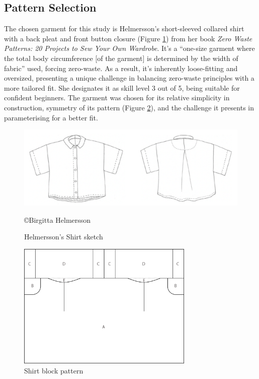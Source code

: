 \subsection{Pattern Selection}
The chosen garment for this study is Helmersson's short-sleeved collared shirt with a back pleat and front button closure (Figure \ref{fig:bh shirt sketch}) from her book \textit{Zero Waste Patterns: 20 Projects to Sew Your Own Wardrobe}. It's a ``one-size garment where the total body circumference [of the garment] is determined by the width of fabric'' used, forcing zero-waste. As a result, it's inherently loose-fitting and oversized, presenting a unique challenge in balancing zero-waste principles with a more tailored fit. She designates it as skill level 3 out of 5, being suitable for confident beginners. The garment was chosen for its relative simplicity in construction, symmetry of its pattern (Figure \ref{fig:bh shirt pattern}), and the challenge it presents in parameterising for a better fit.
\begin{figure} [H]
    \centering
    \includegraphics[width = \textwidth]{Images/finishedgarmentsilhoutte.png}
    \caption{Helmersson's Shirt sketch}
    \copyright {Birgitta Helmersson} %
    \label{fig:bh shirt sketch}
\end{figure}
\begin{figure} [H]
    \centering
    \includegraphics[width = 0.75\textwidth]{Images/originalpattern_whole.png} 
    \caption{Shirt block pattern}
    \label{fig:bh shirt pattern}
\end{figure}
